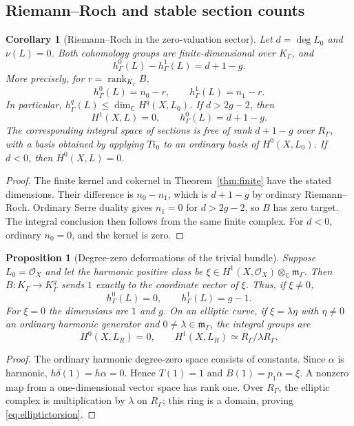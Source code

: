 \documentclass[11pt,letterpaper]{article}
\numberwithin{equation}{section}
\newtheorem{proposition}[theorem]{Proposition}
\newtheorem{corollary}[theorem]{Corollary}
\theoremstyle{definition}
\theoremstyle{remark}
\newcommand{\C}{\mathbb C}
\newcommand{\OO}{\mathcal O}
\newcommand{\mm}{\mathfrak m}
\newcommand{\rank}{\operatorname{rank}}
\newcommand{\Kg}{K_\Gamma}
\newcommand{\rg}{R_\Gamma}
\newcommand{\mg}{\mm_\Gamma}
\newcommand{\vclass}{\nu}
\newcommand{\ot}{\otimes_{\C}}
\begin{document}
\subsection{Riemann--Roch and stable section counts}
\begin{corollary}[Riemann--Roch in the zero-valuation sector]
\label{cor:RR}
Let $d=\deg L_0$ and $\vclass(L)=0$. Both cohomology groups are
finite-dimensional over $\Kg$, and
\begin{equation}
 h^0_\Gamma(L)-h^1_\Gamma(L)=d+1-g.
 \label{eq:RR}
\end{equation}
More precisely, for $r=\rank_{\Kg}B$,
\[
 h^0_\Gamma(L)=n_0-r,\qquad h^1_\Gamma(L)=n_1-r.
\]
In particular, $h^q_\Gamma(L)\le\dim_\C H^q(X,L_0)$.
If $d>2g-2$, then
\begin{equation}
 H^1(X,L)=0,\qquad h^0_\Gamma(L)=d+1-g.
 \label{eq:highdegree}
\end{equation}
The corresponding integral space of sections is free of rank $d+1-g$
over $\rg$, with a basis obtained by applying $Ti_0$ to an ordinary
basis of $H^0(X,L_0)$. If $d<0$, then $H^0(X,L)=0$.
\end{corollary}
\begin{proof}
The finite kernel and cokernel in Theorem~\ref{thm:finite} have the
stated dimensions. Their difference is $n_0-n_1$, which is
$d+1-g$ by ordinary Riemann--Roch. Ordinary Serre duality gives
$n_1=0$ for $d>2g-2$, so $B$ has zero target. The integral conclusion
then follows from the same finite complex. For $d<0$, ordinary
$n_0=0$, and the kernel is zero.
\end{proof}

\begin{proposition}[Degree-zero deformations of the trivial bundle]
\label{prop:degreezero}
Suppose $L_0=\OO_X$ and let the harmonic positive class be
$\xi\in H^1(X,\OO_X)\ot\mg$. Then $B:\Kg\to\Kg^g$ sends
$1$ exactly to the coordinate vector of $\xi$. Thus, if $\xi\ne0$,
\[
 h^0_\Gamma(L)=0,\qquad h^1_\Gamma(L)=g-1.
\]
For $\xi=0$ the dimensions are $1$ and $g$. On an elliptic curve,
if $\xi=\lambda\eta$ with $\eta\ne0$ an ordinary harmonic generator
and $0\ne\lambda\in\mg$, the integral groups are
\begin{equation}
 H^0(X,L_R)=0,\qquad H^1(X,L_R)\simeq\rg/\lambda\rg.
 \label{eq:elliptictorsion}
\end{equation}
\end{proposition}
\begin{proof}
The ordinary harmonic degree-zero space consists of constants. Since
$\alpha$ is harmonic, $h\delta(1)=h\alpha=0$. Hence $T(1)=1$ and
$B(1)=p_1\alpha=\xi$. A nonzero map from a one-dimensional vector space
has rank one. Over $\rg$, the elliptic complex is multiplication by
$\lambda$ on $\rg$; this ring is a domain, proving
\eqref{eq:elliptictorsion}.
\end{proof}
\end{document}
